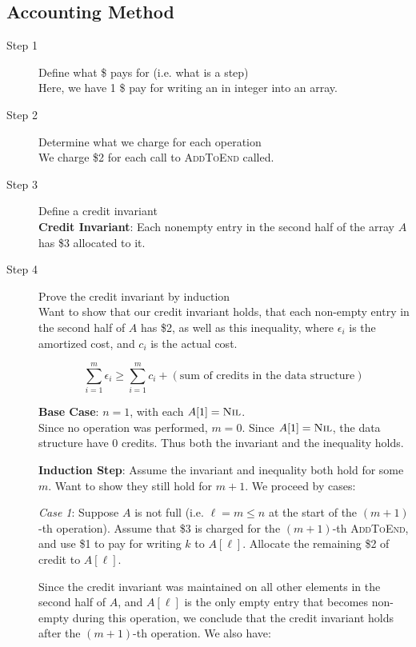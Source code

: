 \subsection*{Accounting Method}
\begin{description}
    \item[Step 1] Define what \$ pays for (i.e. what is a step) \\
    Here, we have 1 \$ pay for writing an in integer into an array. 

    \item[Step 2] Determine what we charge for each operation \\
    We charge \$2 for each call to \textsc{AddToEnd} called.

    \item[Step 3] Define a credit invariant \\
    \textbf{Credit Invariant}: Each nonempty entry in the second half of the array $A$ has \$3 allocated to it.
    
    \item[Step 4] Prove the credit invariant by induction \\
    Want to show that our credit invariant holds, that each non-empty entry in the second half of $A$ has \$2, as well as this inequality, where $\epsilon_i$ is the amortized cost, and $c_i$ is the actual cost. 

    \[
    \sum_{i=1}^{m} \epsilon_i \geq \sum_{i=1}^{m} c_i + (\text{sum of credits in the data structure})
    \]

    \textbf{Base Case}: $n = 1$, with each $A[1] = \textsc{Nil}$. \\
    Since no operation was performed, $m = 0$. Since $A[1] = \textsc{Nil}$, the data structure have 0 credits. Thus both the invariant and the inequality holds.

    \textbf{Induction Step}: Assume the invariant and inequality both hold for some $m$. Want to show they still hold for $m+1$. We proceed by cases:

    \textit{Case 1}: Suppose $A$ is not full (i.e. $\ell = m \leq n$ at the start of the $(m+1)$-th operation). Assume that \$3 is charged for the $(m+1)$-th \textsc{AddToEnd}, and use \$1 to pay for writing $k$ to $A[\ell]$. Allocate the remaining \$2 of credit to $A[\ell]$.

    Since the credit invariant was maintained on all other elements in the second half of $A$, and $A[\ell]$ is the only empty entry that becomes non-empty during this operation, we conclude that the credit invariant holds after the $(m+1)$-th operation. We also have:


\end{description}
